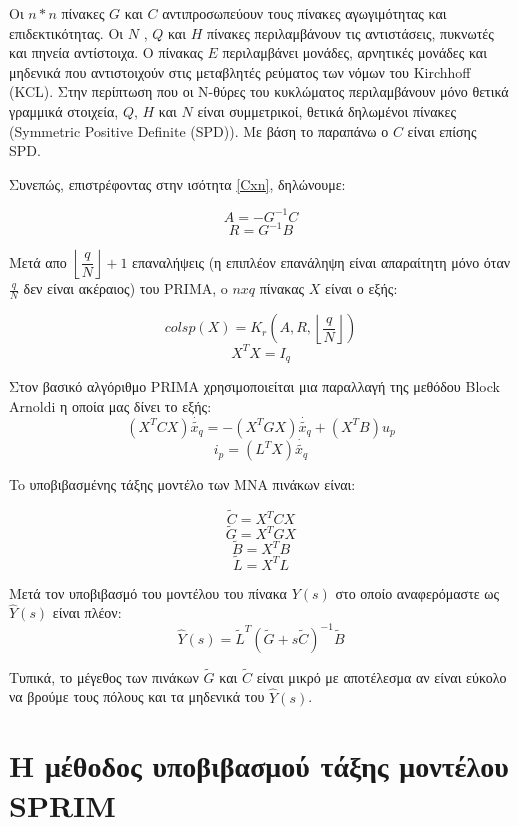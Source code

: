 Οι $n * n$ πίνακες $G$ και $C$ αντιπροσωπεύουν τους πίνακες αγωγιμότητας και επιδεκτικότητας. Οι $N$
, $Q$ και $H$ πίνακες περιλαμβάνουν τις αντιστάσεις, πυκνωτές και πηνεία αντίστοιχα. Ο πίνακας $E$ περιλαμβάνει μονάδες, αρνητικές μονάδες και μηδενικά που αντιστοιχούν στις μεταβλητές ρεύματος των νόμων του  \textlatin{Kirchhoff (KCL)}. Στην περίπτωση που οι N-θύρες του κυκλώματος περιλαμβάνουν μόνο θετικά γραμμικά στοιχεία, $Q$, $H$ και $N$ είναι συμμετρικοί, θετικά δηλωμένοι πίνακες (\textlatin{Symmetric Positive Definite (SPD)}). Με βάση το παραπάνω ο $C$ είναι επίσης \textlatin{SPD}. 

Συνεπώς, επιστρέφοντας στην ισότητα \ref{Cxn}, δηλώνουμε:

\begin{equation}
    A = -G^{-1}C
\end{equation}
\begin{equation}
    R = G^{-1}B
\end{equation}


Μετά απο $\left\lfloor\dfrac{q}{N}\right\rfloor +1$ επαναλήψεις (η επιπλέον επανάληψη είναι απαραίτητη μόνο όταν $\frac{q}{N}$ δεν είναι ακέραιος) του \textlatin{PRIMA}, o $n x q$ πίνακας $X$ είναι ο εξής:

\[
    colsp(X) = K_r(A, R,\left\lfloor\dfrac{q}{N}\right\rfloor)
\]
\[
    X^T X = I_q
\]

Στον βασικό αλγόριθμο \textlatin{PRIMA} χρησιμοποιείται μια παραλλαγή της μεθόδου \textlatin{Block Arnoldi} η οποία μας δίνει το εξής:
\[
    (X^T C X)\dot{\widetilde{x_q}} = - (X^T G X)\dot{\widetilde{x_q}} + (X^T B)u_p
\]
\[
    i_p = (L^TX)\dot{\widetilde{x_q}}
\]

To υποβιβασμένης τάξης μοντέλο των \textlatin{MNA} πινάκων είναι:

\[
    \widetilde{C} = X^T C X
\]
\[
    \widetilde{G} = X^T G X
\]
\[
    \widetilde{B} = X^T B
\]
\[
    \widetilde{L} = X^T L
\]

Μετά τον υποβιβασμό του μοντέλου του πίνακα $Y(s)$ στο οποίο αναφερόμαστε ως $\hat{Y}(s)$ είναι πλέον:
\[
    \hat{Y}(s) = \widetilde{L}^T (\widetilde{G} + s \widetilde{C})^{-1} \widetilde{B}
\]

Τυπικά, το μέγεθος των πινάκων $\widetilde{G}$ και $\widetilde{C}$ είναι μικρό με αποτέλεσμα αν είναι εύκολο να βρούμε τους πόλους και τα μηδενικά του $\hat{Y}(s)$.

\section{Η μέθοδος υποβιβασμού τάξης μοντέλου \textlatin{SPRIM}}

